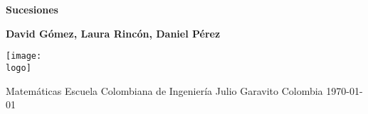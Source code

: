 \documentclass{article}
\newcommand{\logo}{"C:/Users/usuario/OneDrive/Documentos/U/logo-eci.png"}
\newcommand{\titlename}{Sucesiones}%
\renewcommand{\author}{{David Gómez, Laura Rincón, Daniel Pérez}}
\begin{document}
\begin{titlepage}
    \begin{center}
        \vspace*{1cm}

        \textbf{\Huge{\titlename}}

        \vspace{1.5cm}

        \textbf{{\author}}

        \vspace{3cm}

        \texttt{[image: \\logo]}

        \vspace{3cm}

        Matemáticas\linebreak
        Escuela Colombiana de Ingeniería Julio Garavito\linebreak
        Colombia\linebreak
        \today

    \end{center}
\end{titlepage}
\clearpage
\tableofcontents
\clearpage












\end{document}
